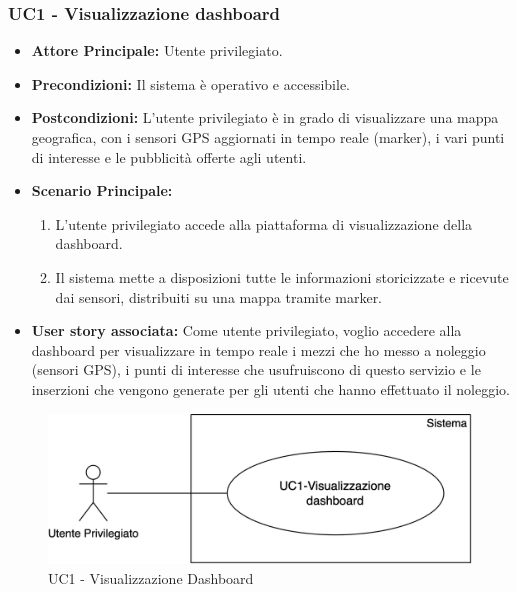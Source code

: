 \documentclass[11pt]{article}
\begin{document}
\begin{justify}
\subsubsection{\textbf{UC1 - Visualizzazione dashboard}}
\begin{itemize}
    \item \textbf{Attore Principale:} Utente privilegiato.
    \item \textbf{Precondizioni:} Il sistema è operativo e accessibile.
    \item \textbf{Postcondizioni:} L'utente privilegiato è in grado di visualizzare una mappa geografica, con i sensori GPS aggiornati in tempo reale (marker), i vari punti di interesse e le pubblicità offerte agli utenti.
    \item \textbf{Scenario Principale:}
        \begin{enumerate}
            \item L'utente privilegiato accede alla piattaforma di visualizzazione della dashboard.
            \item Il sistema mette a disposizioni tutte le informazioni storicizzate e ricevute dai sensori, distribuiti su una mappa tramite marker.
        \end{enumerate}
    \item \textbf{User story associata:} Come utente privilegiato, voglio accedere alla dashboard per visualizzare in tempo reale i mezzi che ho messo a noleggio (sensori GPS), i punti di interesse che usufruiscono di questo servizio e le inserzioni che vengono generate per gli utenti che hanno effettuato il noleggio.
\end{itemize}
\begin{figure}[ht]
    \centering
    \includegraphics[width=0.5\linewidth]{UC1image.png}
    \caption{UC1 - Visualizzazione Dashboard}
    \label{fig:UC1}
\end{figure}

\end{justify}
\end{document}
